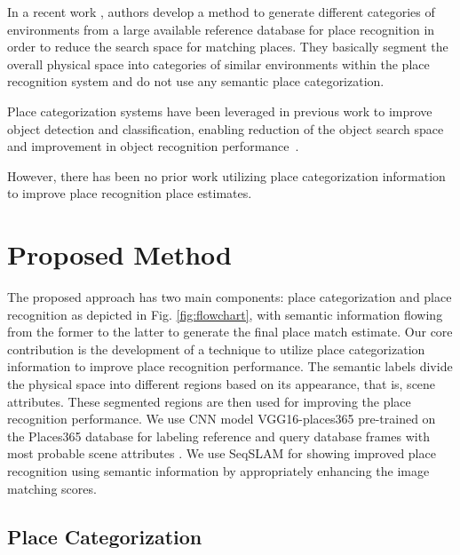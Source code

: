 \documentclass[letterpaper, 10 pt, conference]{ieeeconf}  %
\begin{document}
In a recent work \cite{mohan2015environment}, authors develop a method to generate different categories of environments from a large available reference database for place recognition in order to reduce the search space for matching places. They basically segment the overall physical space into categories of similar environments within the place recognition system and do not use any semantic place categorization.

Place categorization systems have been leveraged in previous work to improve object detection and classification, enabling reduction of the object search space and improvement in object recognition performance~\cite{torralba2003context}. 

However, there has been no prior work utilizing place categorization information to improve place recognition place estimates. 




\section{Proposed Method}
The proposed approach has two main components: place categorization and place recognition as depicted in Fig. \ref{fig:flowchart}, with semantic information flowing from the former to the latter to generate the final place match estimate. Our core contribution is the development of a technique to utilize place categorization information to improve place recognition performance. The semantic labels divide the physical space into different regions based on its appearance, that is, scene attributes. These segmented regions are then used for improving the place recognition performance. We use CNN model VGG16-places365 \cite{cnnPlaces365Github} pre-trained on the Places365 database \cite{zhou2014learning} for labeling reference and query database frames with most probable scene attributes \cite{Patterson2012SunAttributes}. We use SeqSLAM \cite{Milford2012} for showing improved place recognition using semantic information by appropriately enhancing the image matching scores.

\subsection{Place Categorization}
\end{document}
